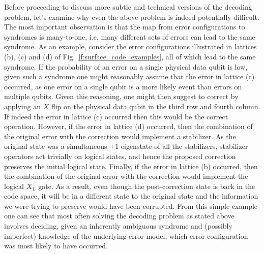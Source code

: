 \documentclass[twocolumn,preprintnumbers,amsmath,amssymb,notitlepage,nofootinbib,longbibliography,superscriptaddress,aps,pra,10pt]{revtex4-1}
\begin{document}
    \noindent Before proceeding to discuss more subtle and technical versions of the decoding problem, let's examine why even the above problem is indeed potentially difficult.
    The most important observation is that the map from error configurations to syndromes is many-to-one, i.e. many different sets of errors can lead to the same syndrome.
    As an example, consider the error configurations illustrated in lattices (b), (c) and (d) of Fig.~\ref{f:surface_code_examples}, all of which lead to the same syndrome.
    If the probability of an error on a single physical data qubit is low, given such a syndrome one might reasonably assume that the error in lattice (c) occurred, as one error on a single qubit is a more likely event than errors on multiple qubits.
    Given this reasoning, one might then suggest to correct by applying an $X$ flip on the physical data qubit in the third row and fourth column.
    If indeed the error in lattice (c) occurred then this would be the correct operation.
    However, if the error in lattice (d) occurred, then the combination of the original error with the correction would implement a stabilizer.
    As the original state was a simultaneous $+1$ eigenstate of all the stabilizers, stabilizer operators act trivially on logical states, and hence the proposed correction preserves the initial logical state.
    Finally, if the error in lattice (b) occurred, then the combination of the original error with the correction would implement the logical $X_L$ gate.
    As a result, even though the post-correction state is back in the code space, it will be in a different state to the original state and the information we were trying to preserve would have been corrupted.
    From this simple example one can see that most often solving the decoding problem as stated above involves deciding, given an inherently ambiguous syndrome and (possibly imperfect) knowledge of the underlying error model, which error configuration was most likely to have occurred.
\end{document}
